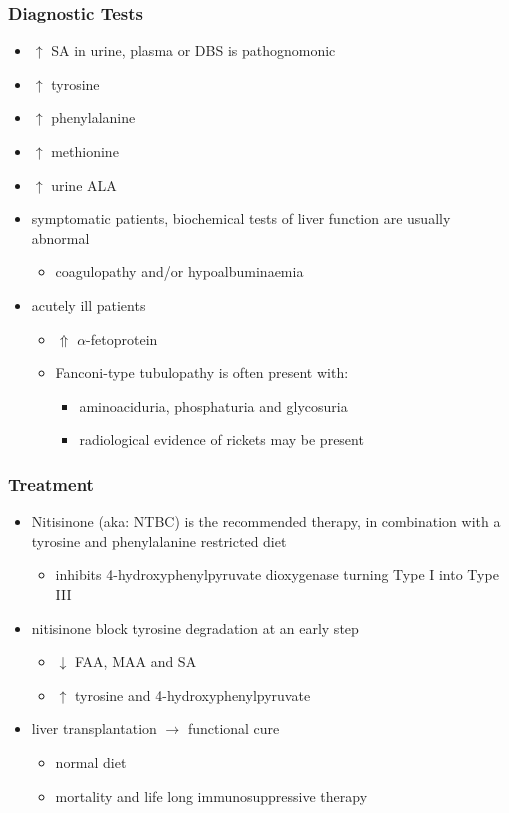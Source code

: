 \documentclass{scrartcl}
\begin{document}
\subsubsection{Diagnostic Tests}
\label{sec:org3df8842}
\begin{itemize}
\item \(\uparrow\) SA in urine, plasma or DBS is pathognomonic
\item \(\uparrow\) tyrosine
\item \(\uparrow\) phenylalanine
\item \(\uparrow\) methionine
\item \(\uparrow\) urine ALA
\item symptomatic patients, biochemical tests of liver function are
usually abnormal
\begin{itemize}
\item coagulopathy and/or hypoalbuminaemia
\end{itemize}
\item acutely ill patients
\begin{itemize}
\item \(\Uparrow\) \(\alpha\)-fetoprotein
\item Fanconi-type tubulopathy is often present with:
\begin{itemize}
\item aminoaciduria, phosphaturia and glycosuria
\item radiological evidence of rickets may be present
\end{itemize}
\end{itemize}
\end{itemize}

\subsubsection{Treatment}
\label{sec:orgac46c14}
\begin{itemize}
\item Nitisinone (aka: NTBC) is the recommended therapy, in combination
with a tyrosine and phenylalanine restricted diet
\begin{itemize}
\item inhibits 4-hydroxyphenylpyruvate dioxygenase turning Type I into Type III
\end{itemize}
\item nitisinone block tyrosine degradation at an early step
\begin{itemize}
\item \(\downarrow\) FAA, MAA and SA
\item \(\uparrow\) tyrosine and 4-hydroxyphenylpyruvate
\end{itemize}
\item liver transplantation \(\to\) functional cure
\begin{itemize}
\item normal diet
\item mortality and life long immunosuppressive therapy
\end{itemize}
\end{itemize}
\end{document}
